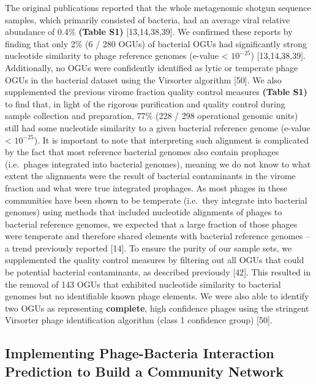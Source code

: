 \documentclass[12pt,]{article}
\begin{document}
The original publications reported that the whole metagenomic shotgun
sequence samples, which primarily consisted of bacteria, had an average
viral relative abundance of 0.4\% \textbf{(Table S1)} {[}13,14,38,39{]}.
We confirmed these reports by finding that only 2\% (6 / 280 OGUs) of
bacterial OGUs had significantly strong nucleotide similarity to phage
reference genomes (e-value \textless{} \(10^{-25}\)) {[}13,14,38,39{]}.
Additionally, no OGUs were confidently identified as lytic or temperate
phage OGUs in the bacterial dataset using the Virsorter algorithm
{[}50{]}. We also supplemented the previous virome fraction quality
control measures \textbf{(Table S1)} to find that, in light of the
rigorous purification and quality control during sample collection and
preparation, 77\% (228 / 298 operational genomic units) still had some
nucleotide similarity to a given bacterial reference genome (e-value
\textless{} \(10^{-25}\)). It is important to note that interpreting
such alignment is complicated by the fact that most reference bacterial
genomes also contain prophages (i.e.~phages integrated into bacterial
genomes), meaning we do not know to what extent the alignments were the
result of bacterial contaminants in the virome fraction and what were
true integrated prophages. As most phages in these communities have been
shown to be temperate (i.e.~they integrate into bacterial genomes) using
methods that included nucleotide alignments of phages to bacterial
reference genomes, we expected that a large fraction of those phages
were temperate and therefore shared elements with bacterial reference
genomes -- a trend previously reported {[}14{]}. To ensure the purity of
our sample sets, we supplemented the quality control measures by
filtering out all OGUs that could be potential bacterial contaminants,
as described previously {[}42{]}. This resulted in the removal of 143
OGUs that exhibited nucleotide similarity to bacterial genomes but no
identifiable known phage elements. We were also able to identify two
OGUs as representing \textbf{complete}, high confidence phages using the
stringent Virsorter phage identification algorithm (class 1 confidence
group) {[}50{]}.

\subsection{Implementing Phage-Bacteria Interaction Prediction to Build
a Community
Network}\label{implementing-phage-bacteria-interaction-prediction-to-build-a-community-network}
\end{document}
